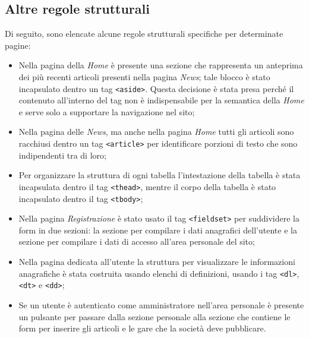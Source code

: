     \subsection{Altre regole strutturali}
    Di seguito, sono elencate alcune regole strutturali specifiche per determinate pagine:
    \begin{itemize}
        \item Nella pagina della \textit{Home} è presente una sezione che rappresenta un anteprima dei più recenti articoli presenti nella pagina \textit{News}; tale blocco è stato incapsulato dentro un tag \texttt{<aside>}. Questa decisione è stata presa perché il contenuto all'interno del tag non è indispensabile per la semantica della \textit{Home} e serve solo a supportare la navigazione nel sito;
        \item Nella pagina delle \textit{News}, ma anche nella pagina \textit{Home} tutti gli articoli sono racchiusi dentro un tag \texttt{<article>} per identificare porzioni di testo che sono indipendenti tra di loro;
        \item Per organizzare la struttura di ogni tabella l'intestazione della tabella è stata incapsulata dentro il tag \texttt{<thead>}, mentre il corpo della tabella è stato incapsulato dentro il tag \texttt{<tbody>};
        \item Nella pagina \textit{Registrazione} è stato usato il tag \texttt{<fieldset>} per suddividere la form in due sezioni: la sezione per compilare i dati anagrafici dell'utente e la sezione per compilare i dati di accesso all'area personale del sito;
        \item Nella pagina dedicata all'utente la struttura per visualizzare le informazioni anagrafiche è stata costruita usando elenchi di definizioni, usando i tag \texttt{<dl>}, \texttt{<dt>} e \texttt{<dd>};
        \item Se un utente è autenticato come amministratore nell'area personale è presente un pulsante per passare dalla sezione personale alla sezione che contiene le form per inserire gli articoli e le gare che la società deve pubblicare.
    \end{itemize}